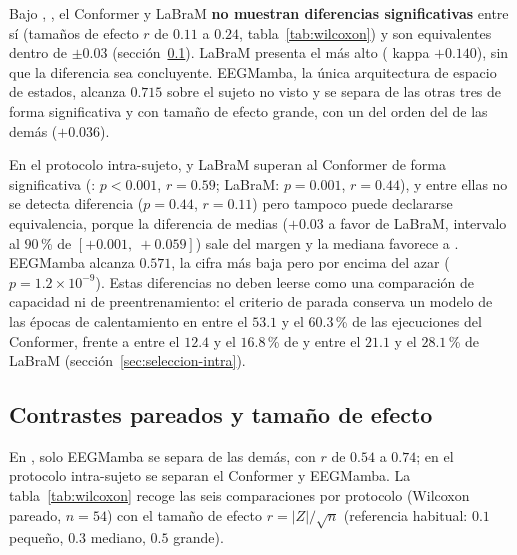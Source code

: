 Bajo \loso{}, \eegnet{}, el Conformer y LaBraM \textbf{no muestran diferencias
significativas} entre sí (tamaños de efecto $r$ de $0.11$ a $0.24$, tabla~\ref{tab:wilcoxon}) y son
equivalentes dentro de $\pm 0.03$ (sección~\ref{sec:wilcoxon}). LaBraM presenta el \dsi{} más alto
(\dsi{} kappa $+0.140$), sin que la diferencia sea concluyente. EEGMamba, la única arquitectura de espacio
de estados, alcanza $0.715$ sobre el sujeto no visto y se separa de las otras tres de forma significativa
y con tamaño de efecto grande, con un \dsi{} del orden del de las demás ($+0.036$).

En el protocolo intra-sujeto, \eegnet{} y LaBraM superan al Conformer de forma significativa
(\eegnet{}: $p < 0.001$, $r = 0.59$; LaBraM: $p = 0.001$, $r = 0.44$), y entre ellas no se detecta
diferencia ($p = 0.44$, $r = 0.11$) pero tampoco puede declararse equivalencia, porque la diferencia de
medias ($+0.03$ a favor de LaBraM, intervalo al $90$\,\% de $[+0.001,\ +0.059]$) sale del margen y la mediana
favorece a \eegnet{}. EEGMamba alcanza $0.571$, la cifra más baja pero por encima del azar
($p = 1.2\times10^{-9}$). Estas diferencias no deben leerse como una comparación de capacidad ni de
preentrenamiento: el criterio de parada conserva un modelo de las épocas de calentamiento en entre el
$53.1$ y el $60.3$\,\% de las ejecuciones del Conformer, frente a entre el $12.4$ y el $16.8$\,\% de
\eegnet{} y entre el $21.1$ y el $28.1$\,\% de LaBraM (sección~\ref{sec:seleccion-intra}).

\subsection{Contrastes pareados y tamaño de efecto}
\label{sec:wilcoxon}

En \loso{}, solo EEGMamba se separa de las demás, con $r$ de $0.54$ a $0.74$; en el protocolo
intra-sujeto se separan el Conformer y EEGMamba. La tabla~\ref{tab:wilcoxon} recoge las seis
comparaciones por protocolo (Wilcoxon pareado, $n = 54$) con el tamaño de efecto
$r = |Z|/\sqrt{n}$ (referencia habitual: $0.1$ pequeño, $0.3$ mediano, $0.5$ grande).

